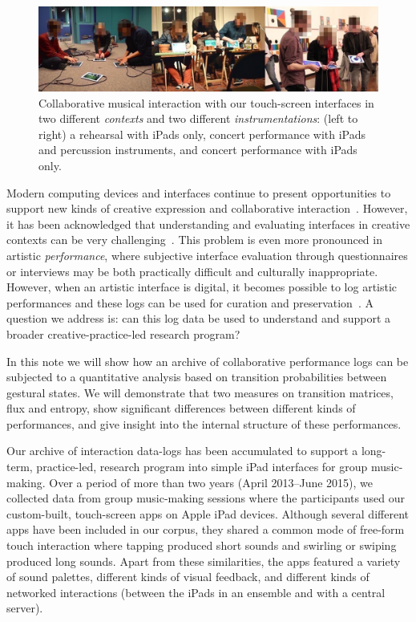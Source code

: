 \documentclass{sigchi}
\begin{document}
\begin{figure}
  \centering
  \includegraphics[width=\linewidth]{figures/three-performance-contexts}
  \caption{Collaborative musical interaction with our touch-screen
    interfaces in two different {\em contexts} and two different {\em
      instrumentations}: (left to right) a rehearsal with iPads only,
    concert performance with iPads and percussion instruments, and
    concert performance with iPads
    only.\label{fig:three-performance-contexts}}
\end{figure}


Modern computing devices and interfaces continue to present
opportunities to support new kinds of creative expression and
collaborative interaction~\cite{Resnick:2005yu}. However, it has been
acknowledged that understanding and evaluating interfaces in creative
contexts can be very challenging~\cite{Shneiderman:2007qv}. This problem is
even more pronounced in artistic \emph{performance}, where subjective
interface evaluation through questionnaires or interviews may be both
practically difficult and culturally inappropriate. However, when an artistic interface
is digital, it becomes possible to log artistic performances and these
logs can be used for curation and
preservation~\cite{England:2014ys}. A question we address is: can this log data
be used to understand and support a
broader creative-practice-led research program?

In this note we will show how an archive of collaborative performance
logs can be subjected to a quantitative analysis based on
transition probabilities between gestural states. We will demonstrate
that two measures on transition matrices, flux and entropy, show
significant differences between different kinds of performances, and
give insight into the internal structure of these performances.

Our archive of interaction data-logs has been accumulated to support a
long-term, practice-led, research program into simple iPad interfaces
for group music-making. Over a period of more than two years (April
2013--June 2015), we collected data from group music-making sessions
where the participants used our custom-built, touch-screen apps on
Apple iPad devices. Although several different apps have been included
in our corpus, they shared a common mode of free-form touch
interaction where tapping produced short sounds and swirling or
swiping produced long sounds. Apart from these similarities, the apps
featured a variety of sound palettes, different kinds of visual
feedback, and different kinds of networked interactions (between the
iPads in an ensemble and with a central server).
\end{document}
